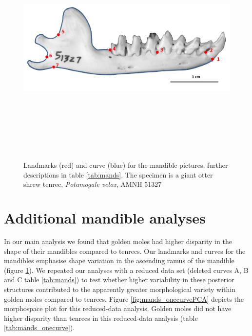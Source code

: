 \documentclass[12pt,a4paper]{article}
\begin{document}
	\begin{figure}[H] 
 	\centering
  	\includegraphics[width=12cm, height=12cm, keepaspectratio=true]
  	{figures/AMNH_51327_landmarksdiagram.png}
    \caption {Landmarks (red) and curve (blue) for the mandible pictures, further descriptions in table \ref{tab:mands}. The specimen is a giant otter shrew tenrec, \textit{Potamogale velox}, AMNH 51327}
  	\label{fig:mands_landmarks}
  	\end{figure}

	\begin{table}[h]			
	\centering
	\caption{Descriptions of the landmarks (points) and curves (semilandmarks) for the mandibles in lateral (buccal) view (see figure \ref{fig:mands_landmarks})}
	
	\label{tab:mands} 
	\end{table}
\section{Additional mandible analyses}

	In our main analysis we found that golden moles had higher disparity in the shape of their mandibles compared to tenrecs. Our landmarks and curves for the mandibles emphasise shape variation in the ascending ramus of the mandible (figure \ref{fig:mands_landmarks}). We repeated our analyses with a reduced data set (deleted curves A, B and C table \ref{tab:mands}) to test whether higher variability in these posterior structures contributed to the apparently greater morphological variety within golden moles compared to tenrecs. Figure \ref{fig:mands_onecurvePCA} depicts the morphospace plot for this reduced-data analysis. Golden moles did not have higher disparity than tenrecs in this reduced-data analysis (table \ref{tab:mands_onecurve}). 
\end{document}
